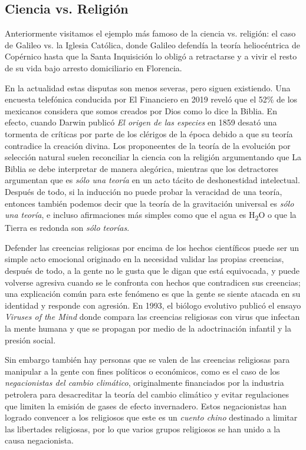 \subsection*{Ciencia vs. Religión}
\label{sub:cienciavsreligion}
Anteriormente visitamos el ejemplo más famoso de la ciencia vs. religión: el
caso de Galileo vs. la Iglesia Católica, donde Galileo defendía la teoría
heliocéntrica de Copérnico hasta que la Santa Inquisición lo obligó a
retractarse y a vivir el resto de su vida bajo arresto domiciliario en
Florencia.

En la actualidad estas disputas son menos severas, pero siguen existiendo.
Una encuesta telefónica conducida por El Financiero\cite{Moreno2019} en 2019
reveló que el 52\% de los mexicanos considera que somos creados por Dios
como lo dice la Biblia.
En efecto, cuando Darwin publicó \emph{El origen de las especies} en 1859
desató una tormenta de críticas por parte de los clérigos de la época debido a
que su teoría contradice la creación divina.
Los proponeentes de la teoría de la evolución por selección natural suelen
reconciliar la ciencia con la religión argumentando que La Biblia se debe
interpretar de manera alegórica, mientras que los detractores argumentan que
es \emph{sólo una teoría} en un acto tácito de deshonestidad intelectual.
Después de todo, si la inducción no puede probar la veracidad de una teoría,
entonces también podemos decir que la teoría de la gravitación universal es
\emph{sólo una teoría}, e incluso afirmaciones más simples como que el agua
es H\textsubscript{2}O o que la Tierra es redonda son \emph{sólo teorías}.

Defender las creencias religiosas por encima de los hechos científicos puede ser
un simple acto emocional originado en la necesidad validar las propias
creencias, después de todo, a la gente no le gusta que le digan que está
equivocada, y puede volverse agresiva cuando se le confronta con hechos que
contradicen sus creencias; una explicación común para este fenómeno es que la
gente se siente atacada en su identidad y responde con agresión.
En 1993, el biólogo evolutivo  publicó
el ensayo \emph{Viruses of the Mind}\cite{Dahlbom1993-ky} donde compara las
creencias religiosas con virus que infectan la mente humana y que se propagan
por medio de la adoctrinación infantil y la presión social.

Sin embargo también hay personas que se valen de las creencias religiosas para
manipular a la gente con fines políticos o económicos, como es el caso de los
\emph{negacionistas del cambio climático}, originalmente financiados por la
industria petrolera para desacreditar la teoría del cambio climático y evitar
regulaciones que limiten la emisión de gases de efecto invernadero.
Estos negacionistas han logrado convencer a los religiosos que este es un
\emph{cuento chino} destinado a limitar las libertades religiosas, por lo que
varios grupos religiosos se han unido a la causa negacionista.

